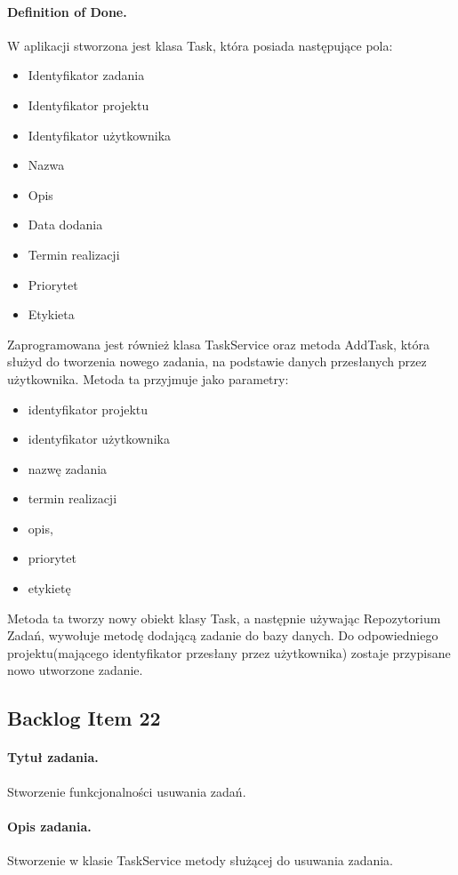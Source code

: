\documentclass[a4paper]{article}
\begin{document}
\paragraph{Definition of Done.} W aplikacji stworzona jest klasa Task, która posiada następujące pola:
\begin{itemize}
\item Identyfikator zadania
\item Identyfikator projektu
\item Identyfikator użytkownika
\item Nazwa
\item Opis
\item Data dodania
\item Termin realizacji
\item Priorytet
\item Etykieta
\end{itemize}
Zaprogramowana jest również klasa TaskService oraz metoda AddTask, która służyd do tworzenia nowego zadania, na podstawie danych przesłanych przez użytkownika. Metoda ta przyjmuje jako parametry:
\begin{itemize}
\item identyfikator projektu
\item identyfikator użytkownika
\item nazwę zadania
\item termin realizacji
\item opis, 
\item priorytet
\item etykietę
\end{itemize}
Metoda ta tworzy nowy obiekt klasy Task, a następnie używając Repozytorium Zadań, wywołuje metodę dodającą zadanie do bazy danych. Do odpowiedniego projektu(mającego identyfikator przesłany przez użytkownika) zostaje przypisane nowo utworzone zadanie.

\subsection{Backlog Item 22} 
\paragraph{Tytuł zadania.}  Stworzenie funkcjonalności usuwania zadań.
\paragraph{Opis zadania.} Stworzenie w klasie TaskService metody służącej do usuwania zadania. 
\end{document}
